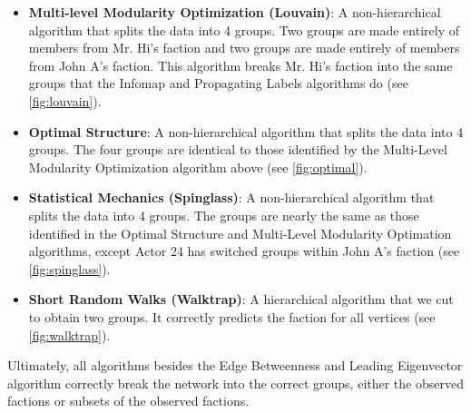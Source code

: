 \begin{itemize}
\item \textbf{Multi-level Modularity Optimization (Louvain)}: A non-hierarchical algorithm that splits the data into 4 groups. Two groups are made entirely of members from Mr. Hi's faction and two groups are made entirely of members from John A's faction. This algorithm breaks Mr. Hi's faction into the same groups that the Infomap and Propagating Labels algorithms do (see \cref{fig:louvain}).
\item \textbf{Optimal Structure}: A non-hierarchical algorithm that splits the data into 4 groups. The four groups are identical to those identified by the Multi-Level Modularity Optimization algorithm above (see \cref{fig:optimal}).
\item \textbf{Statistical Mechanics (Spinglass)}: A non-hierarchical algorithm that splits the data into 4 groups. The groups are nearly the same as those identified in the Optimal Structure and Multi-Level Modularity Optimation algorithms, except Actor 24 has switched groups within John A's faction (see \cref{fig:spinglass}).
\item \textbf{Short Random Walks (Walktrap)}: A hierarchical algorithm that we cut to obtain two groups. It correctly predicts the faction for all vertices (see \cref{fig:walktrap}).
\end{itemize}
Ultimately, all algorithms besides the Edge Betweenness and Leading Eigenvector algorithm correctly break the network into the correct groups, either the observed factions or subsets of the observed factions.

